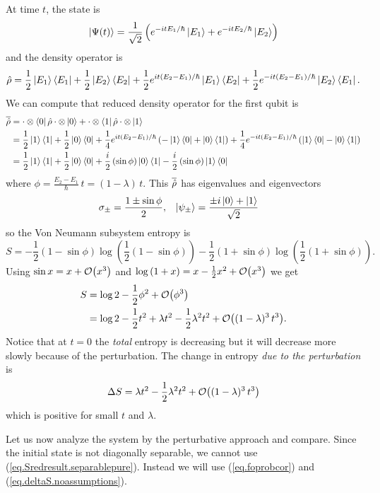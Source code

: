 At time \(t\), the state is
\[
\left|\Psi(t)\right\rangle = \frac{1}{\sqrt{2}}\left(e^{-itE_1/\hbar}\left|E_1\right\rangle + e^{-itE_2/\hbar} \left|E_2\right\rangle\right)
\]
and the density operator is
\[
\hat{\rho} = \frac{1}{2}\left|E_1\right\rangle\left\langle E_1\right| + \frac{1}{2}\left|E_2\right\rangle\left\langle E_2\right| + \frac{1}{2} e^{it\left(E_2-E_1\right)/\hbar} \left|E_1\right\rangle\left\langle E_2\right| + \frac{1}{2} e^{-it\left(E_2 - E_1\right)/\hbar} \left|E_2\right\rangle\left\langle E_1\right|.
\]
We can compute that reduced density operator for the first qubit is
\begin{align*}
\overline{\hat{\rho}} &= \cdot\otimes\left\langle0\right| \hat{\rho} \cdot\otimes\left|0\right\rangle + \cdot\otimes\left\langle1\right| \hat{\rho} \cdot\otimes\left|1\right\rangle \\
&= \frac{1}{2} \left|1\right\rangle\left\langle1\right| + \frac{1}{2}\left|0\right\rangle\left\langle0\right| + \frac{1}{4} e^{it\left(E_2-E_1\right)/\hbar}\left(-\left|1\right\rangle\left\langle0\right| + \left|0\right\rangle\left\langle1\right|\right) + \frac{1}{4} e^{-it\left(E_2-E_1\right)/\hbar}\left(\left|1\right\rangle\left\langle0\right| - \left|0\right\rangle\left\langle1\right|\right) \\
&= \frac{1}{2}\left|1\right\rangle\left\langle1\right| + \frac{1}{2}\left|0\right\rangle\left\langle0\right| + \frac{i}{2} \left(\sin \phi\right) \left|0\right\rangle\left\langle1\right| - \frac{i}{2} \left(\sin \phi\right) \left|1\right\rangle\left\langle0\right|
\end{align*}
where \(\phi = \frac{E_2-E_1}{\hbar}\,t = (1-\lambda)\,t\).
This \(\overline{\hat{\rho}}\) has eigenvalues and eigenvectors
\begin{align*}
\sigma_{\pm} &= \frac{1 \pm \sin \phi}{2}, &
\left|\psi_\pm\right\rangle &= \frac{\pm i \left|0\right\rangle + \left|1\right\rangle}{\sqrt{2}}
\end{align*}
so the Von Neumann subsystem entropy is
\[
S = - \frac{1}{2}\left(1-\sin\phi\right) \log \left(\frac{1}{2}\left(1-\sin\phi\right)\right) - \frac{1}{2}\left(1+\sin\phi\right) \log \left(\frac{1}{2}\left(1+\sin\phi\right)\right).
\]
Using \(\sin x = x + \mathcal{O}{\left(x^3\right)}\) and \(\log\left(1+x\right) = x - \frac{1}{2} x^2 + \mathcal{O}{\left(x^3\right)}\) we get
\begin{align*}
S &= \log 2 - \frac{1}{2}\phi^2 + \mathcal{O}{\left(\phi^3\right)} \\
&= \log 2 - \frac{1}{2}t^2 + \lambda t^2 - \frac{1}{2}\lambda^2 t^2 + \mathcal{O}{\left((1-\lambda)^3\,t^3\right)}.
\end{align*}
Notice that at \(t=0\) the \emph{total} entropy is decreasing but it will decrease more slowly because of the perturbation. The change in entropy \emph{due to the perturbation} is
\[
\Delta S = \lambda t^2 - \frac{1}{2} \lambda^2 t^2 + \mathcal{O}{\left((1-\lambda)^3\,t^3\right)}
\]
which is positive for small \(t\) and \(\lambda\). 

Let us now analyze the system by the perturbative approach and compare. Since the initial state is not diagonally separable, we cannot use (\ref{eq.Sredresult.separablepure}). Instead we will use (\ref{eq.foprobcor}) and (\ref{eq.deltaS.noassumptions}).

